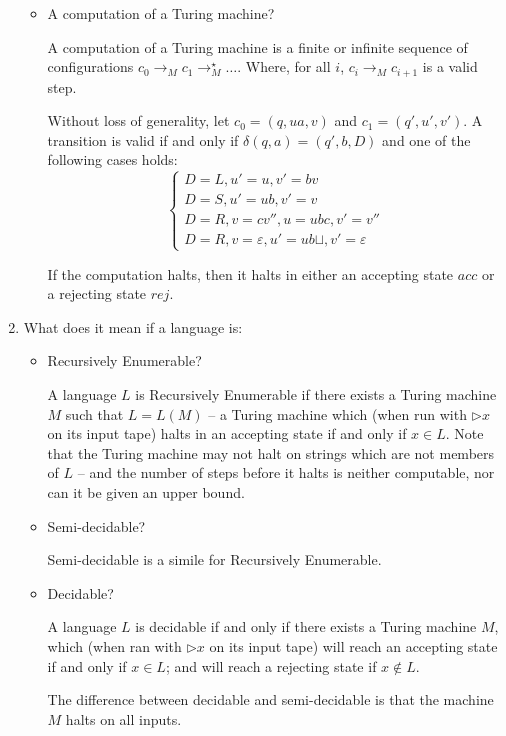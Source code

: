 \documentclass[10pt,\jkfside,a4paper]{article}
\begin{document}
\begin{enumerate}
\begin{itemize}
\item A computation of a Turing machine?

A computation of a Turing machine is a finite or infinite sequence of
configurations $c_0 \to_M c_1 \to_M^\star \dots$. Where, for all $i$, $c_i
\to_M c_{i+1}$ is a valid step.

Without loss of generality, let $c_0 = (q, ua, v)$ and $c_1 = (q', u', v'
)$. A transition is valid if and only if $\delta(q, a) = (q', b, D)$ and one
of the following cases holds:
\[
\begin{cases}
D = L, u' = u, v' = bv \\
D = S, u' = ub, v' = v \\
D = R, v = cv'', u = ubc, v' = v'' \\
D = R, v = \varepsilon, u' = ub\sqcup, v' = \varepsilon
\end{cases}
\]

If the computation halts, then it halts in either an accepting state $acc$
or a rejecting state $rej$.

\end{itemize}

\item What does it mean if a language is:

\begin{itemize}

\item Recursively Enumerable?

A language $L$ is Recursively Enumerable if there exists a Turing machine
$M$ such that $L = L(M)$ -- a Turing machine which (when run with
$\triangleright x$ on its input tape) halts in an accepting state if and
only if $x \in L$. Note that the Turing machine may not halt on strings
which are not members of $L$ -- and the number of steps before it halts is
neither computable, nor can it be given an upper bound.

\item Semi-decidable?

Semi-decidable is a simile for Recursively Enumerable.

\item Decidable?

A language $L$ is decidable if and only if there exists a Turing machine
$M$, which (when ran with $\triangleright x$ on its input tape) will reach an
accepting state if and only if $x \in L$; and will reach a rejecting state
if $x \notin L$.

The difference between decidable and semi-decidable is that the machine $M$
halts on all inputs.


\end{itemize}
\end{enumerate}
\end{document}
